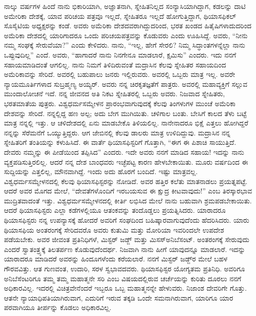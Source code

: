 ನಾಲ್ಕು ವರ್ಷಗಳ ಹಿಂದೆ ನಾನು ಭಿಕಾರಿಯಾಗಿ, ಅಜ್ಞಾತನಾಗಿ, ಸ್ನೇಹಿತನಿಲ್ಲದ ಸಂನ್ಯಾಸಿಯಾಗಿದ್ದಾಗ, ಕಡಲನ್ನು ದಾಟಿ ಅಮೇರಿಕಾ ದೇಶಕ್ಕೆ, ಯಾವ ಪರಿಚಯ ಪತ್ರವೂ ಇಲ್ಲದೆ, ಸ್ನೇಹಿತರೂ ಇಲ್ಲದೆ ಹೋಗುತ್ತಿದ್ದಾಗ, ಥಿಯಾಸಫಿಕಲ್​ ಸೊಸೈಟಿಯ ಅಧ್ಯಕ್ಷರನ್ನು ಕಂಡೆ. ಅವರು ಅಮೆರಿಕಾ ದೇಶದವರಾಗಿದ್ದುದರಿಂದ, ಭರತ ಖಂಡದ ಹಿತೈಷಿಗಳಾದುದರಿಂದ ಅಮೆರಿಕಾ ದೇಶದಲ್ಲಿ ಯಾರಿಗಾದರೂ ಒಂದು ಪರಿಚಯಪತ್ರವನ್ನು ಕೊಡುವರು ಎಂದು ಊಹಿಸಿದ್ದೆ. ಅವರು, “ನೀನು ನಮ್ಮ ಸಂಘಕ್ಕೆ ಸೇರುವೆಯಾ?” ಎಂದು ಕೇಳಿದರು. ನಾನು, “ಇಲ್ಲ, ಹೇಗೆ ಸೇರಲಿ? ನಿಮ್ಮ ಸಿದ್ಧಾಂತಗಳನ್ನೆಲ್ಲಾ ನಾನು ಒಪ್ಪುವುದಿಲ್ಲ” ಎಂದೆ. ಅವರು, “ಹಾಗಾದರೆ ನಾನು ನಿನಗೇನೂ ಮಾಡಲಾರೆ, ಕ್ಷಮಿಸು” ಎಂದರು. ಇದು ನನಗೆ ಸಹಾಯಮಾಡಿದಂತೆ ಆಗಲಿಲ್ಲ. ನಾನು ನಿಮಗೆ ತಿಳಿದಿರುವಂತೆ ಮದ್ರಾಸಿನ ಕೆಲವು ಸ್ನೇಹಿತರ ಸಹಾಯದಿಂದ ಅಮೆರಿಕಾವನ್ನು ಸೇರಿದೆ. ಅವರಲ್ಲಿ ಬಹುಪಾಲು ಜನರು ಇಲ್ಲಿರುವರು. ಅವರಲ್ಲಿ ಒಬ್ಬರು ಮಾತ್ರ ಇಲ್ಲ. ಅವರೇ ನ್ಯಾಯಮೂರ್ತಿಗಳಾದ ಸುಬ್ರಹ್ಮಣ್ಯ ಅಯ್ಯರ್​. ಅವರು ನನ್ನ ಚಿರಕೃತಜ್ಞತೆಗೆ ಪಾತ್ರರು. ಅವರಲ್ಲಿ ಮಹಾವ್ಯಕ್ತಿಗೆ ಸಲ್ಲುವ ಮುಂದಾಲೋಚನೆ ಇದೆ. ನನ್ನ ಜೀವನದ ಅತಿ ನಿಕಟ ಸ್ನೇಹಿತರಲ್ಲಿ ಒಬ್ಬರು ಅವರು. ನಿಜವಾದ ಸ್ನೇಹಿತರು, ಭರತಮಾತೆಯ ಪುತ್ರರು. ವಿಶ್ವಧರ್ಮಸಮ್ಮೇಳನ ಪ್ರಾರಂಭವಾಗುವುದಕ್ಕೆ ಕೆಲವು ತಿಂಗಳುಗಳ ಮುಂಚೆ ಅಮೆರಿಕಾ ದೇಶವನ್ನು ಸೇರಿದೆ. ನನ್ನಲ್ಲಿದ್ದ ಹಣ ಅಲ್ಪ; ಅದು ಬೇಗ ಮುಗಿಯಿತು. ಚಳಿಗಾಲ ಬಂತು. ಬೇಸಿಗೆ ಕಾಲದ ತೆಳು ಬಟ್ಟೆ ಮಾತ್ರ ನನ್ನಲ್ಲಿ ಇತ್ತು. ಆ ಚಳಿದೇಶದಲ್ಲಿ ಏನು ಮಾಡಬೇಕೊ ತಿಳಿಯಲಿಲ್ಲ. ನಾನೇನಾದರೂ ಭಿಕ್ಷೆ ಎತ್ತಲು ಹೋಗಿದ್ದರೆ ನನ್ನನ್ನು ಸೆರೆಮನೆಗೆ ಒಯ್ಯುತ್ತಿದ್ದರು. ಆಗ ಜೇಬಿನಲ್ಲಿ ಕೆಲವು ಡಾಲರು ಮಾತ್ರ ಉಳಿದಿದ್ದುವು. ಮದ್ರಾಸಿನ ನನ್ನ ಸ್ನೇಹಿತರಿಗೆ ತಂತಿಯನ್ನು ಕಳುಹಿಸಿದೆ. ಈ ವಾರ್ತೆ ಥಿಯಾಸಫಿಸ್ಟರಿಗೆ ಗೊತ್ತಾಗಿ, “ಈಗ ಈ ಪಿಶಾಚಿ ಸಾಯುತ್ತಿದೆ. ದೇವರು ನಮ್ಮನ್ನು ಈ ಪೀಡೆಯಿಂದ ತಪ್ಪಿಸಿದ” ಎಂದರು. ಇದೇ ಅವರು ನನಗೆ ಮಾಡಿದ ಸಹಾಯ! ಇದನ್ನು ನಾನು ವ್ಯಕ್ತಪಡಿಸುತ್ತಿರಲಿಲ್ಲ. ಆದರೆ ನನ್ನ ದೇಶ ಬಾಂಧವರು ಇಚ್ಛೆಪಟ್ಟ ಕಾರಣ ಹೇಳಬೇಕಾಯಿತು. ಮೂರು ವರ್ಷದಿಂದ ಈ ಸುದ್ದಿಯನ್ನು ಎತ್ತಲಿಲ್ಲ, ಮೌನವಾಗಿದ್ದೆ. ಇಂದು ಅದು ಹೊರಗೆ ಬಂದಿದೆ. ಇಷ್ಟು ಮಾತ್ರವಲ್ಲ. ವಿಶ್ವಧರ್ಮಸಮ್ಮೇಳನದಲ್ಲಿ ಕೆಲವು ಥಿಯಾಸಫಿಸ್ಟರನ್ನು ನೋಡಿದೆ. ಅವರ ಹತ್ತಿರ ಕಲೆತು ಮಾತನಾಡಲು ಪ್ರಯತ್ನಪಟ್ಟೆ. ಆದರೆ ಅವರ ಮೊಗದ ಮೇಲೆ, “ದೇವತೆಗಳೊಂದಿಗೆ ಇರಬಯಸುವ ಈ ಕ್ಷುದ್ರ ಕೀಟವಾವುದು!” ಎಂಬ ತಿರಸ್ಕಾರಭಾವ ಮುದ್ರಿತವಾದಂತೆ ಇತ್ತು. ವಿಶ್ವಧರ್ಮಸಮ್ಮೇಳನದಲ್ಲಿ ಕೀರ್ತಿ ಲಭಿಸಿದ ಮೇಲೆ ನಾನು ಬಹುವಾಗಿ ಶ್ರಮಪಡಬೇಕಾಯಿತು. ಆದರೆ ಥಿಯಾಸಫಿಸ್ಟರು ಎಲ್ಲಾ ಕಡೆಗಳಲ್ಲಿಯೂ ಆತಂಕವನ್ನು ತಂದೊಡ್ಡಲು ಪ್ರಯತ್ನಿಸಿದರು. ಯಾರಾದರೂ ಥಿಯಾಸಫಿಸ್ಟರು ನನ್ನ ಉಪನ್ಯಾಸಕ್ಕೆ ಹೋದರೆ ಅವರಿಗೆ ಸಂಘದಿಂದ ಬಹಿಷ್ಕಾರವಾಗುವುದೆಂದು ಹೆದರಿಸಿ\-ದರು. ಯಾರು ಥಿಯಾಸಫಿಯ ಅಂತರಂಗಕ್ಕೆ ಸೇರಿದವರೊ ಅವರು ಕುತುಮಿ ಮತ್ತು ಮೋರಿಯಾ ಇವರಿಂದಲೇ ಉಪದೇಶ ಪಡೆಯಬೇಕು. ಅವರ ಜೀವಂತ ಪ್ರತಿನಿಧಿಗಳೆ, ಮಿಸ್ಟರ್​ ಜಡ್ಜ್ ಮತ್ತು ಮಿಸಸ್​ ಅನಿಬೆಸಂಟ್​. ಅಂತರಂಗಕ್ಕೆ ಸೇರುವುದು ಎಂದರೆ ಸ್ವಾತಂತ್ರ್ಯಕ್ಕೆ ತಿಲತರ್ಪಣ ಕೊಡುವುದೆಂದರ್ಥ. ನಿಜವಾಗಿ ನಾನು ಹೀಗೆ ಯಾವುದನ್ನೂ ಮಾಡಲಾರೆ. ಇದನ್ನು ಯಾರಾದರೂ ಮಾಡಿದರೆ ಅವರನ್ನು ಹಿಂದೂಗಳೆಂದು ಕರೆಯಲಾರೆ. ನನಗೆ ಮಿಸ್ಟರ್​ ಜಡ್ಜ್‌ರ ಮೇಲೆ ಬಹಳ ಗೌರವವಿತ್ತು. ಆತ ಗುಣವಂತ, ಉದಾರಿ, ಸರಳ ಸ್ವಭಾವದವರು. ಥಿಯಾಸಫಿಸ್ಟರ ಯೋಗ್ಯತಮ ಪ್ರತಿನಿಧಿ. ಅವರಿಗೂ ಅನಿಬೆಸೆಂಟರಿಗೂ ತಮ್ಮ ತಮ್ಮ ಮಹಾತ್ಮನೇ ಸರಿ ಎಂಬ ವಿಷಯದಲ್ಲಿರುವ ಚರ್ಚೆಯನ್ನು ಕುರಿತು ದೂರಲು ನನಗೆ ಅಧಿಕಾರವಿಲ್ಲ. ಇದರಲ್ಲಿ ವಿಚಿತ್ರವೇನೆಂದರೆ ಇಬ್ಬರೂ ಒಬ್ಬ ಮಹಾತ್ಮನನ್ನೇ ಹೇಳುವರು. ನಿಜಾಂಶ ದೇವರಿಗೇ ಗೊತ್ತು. ಆತನೇ ನ್ಯಾಯಾಧಿಪತಿಯಾಗಿರುವಾಗ, ಎದುರಿಗೆ ಇರುವ ತಕ್ಕಡಿ ಒಂದೇ ಸಮನಾಗಿರುವಾಗ, ಯಾರಿಗೂ ಯಾರ ಪರವಾಗಿಯೂ ತೀರ್ಪನ್ನು ಕೊಡಲು ಅಧಿಕಾರವಿಲ್ಲ.

